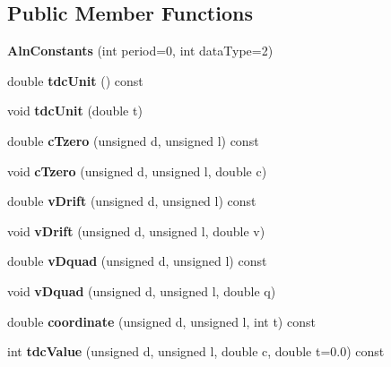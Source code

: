 \subsection*{Public Member Functions}
\begin{DoxyCompactItemize}
\item 
{\bfseries AlnConstants} (int period=0, int dataType=2)\label{classTBTrack_1_1AlnConstants_af91893338898d5c5d60add694f7ad53c}

\item 
double {\bfseries tdcUnit} () const \label{classTBTrack_1_1AlnConstants_af8ecb4ff47971cea86ea57719657405d}

\item 
void {\bfseries tdcUnit} (double t)\label{classTBTrack_1_1AlnConstants_a1070adc84db54a491c8ead531aa74bfe}

\item 
double {\bfseries cTzero} (unsigned d, unsigned l) const \label{classTBTrack_1_1AlnConstants_a92e168a711778633d7629411f6567ec6}

\item 
void {\bfseries cTzero} (unsigned d, unsigned l, double c)\label{classTBTrack_1_1AlnConstants_a02360b72db926a833aa6883221bb25c1}

\item 
double {\bfseries vDrift} (unsigned d, unsigned l) const \label{classTBTrack_1_1AlnConstants_a3e0815db478c533f423c090090ac7f58}

\item 
void {\bfseries vDrift} (unsigned d, unsigned l, double v)\label{classTBTrack_1_1AlnConstants_ab1801a04e89c0d92726ebaf82da6c7ea}

\item 
double {\bfseries vDquad} (unsigned d, unsigned l) const \label{classTBTrack_1_1AlnConstants_a502d35c057f8703828a8c4772c981372}

\item 
void {\bfseries vDquad} (unsigned d, unsigned l, double q)\label{classTBTrack_1_1AlnConstants_a69529ea7d72f1d98029aa479ef5f94a6}

\item 
double {\bfseries coordinate} (unsigned d, unsigned l, int t) const \label{classTBTrack_1_1AlnConstants_a4248f4f0634ada340af67a1e5129c5dc}

\item 
int {\bfseries tdcValue} (unsigned d, unsigned l, double c, double t=0.0) const \label{classTBTrack_1_1AlnConstants_aa51d47ab24355ca238e1e79ff8acf053}


\end{DoxyCompactItemize}
